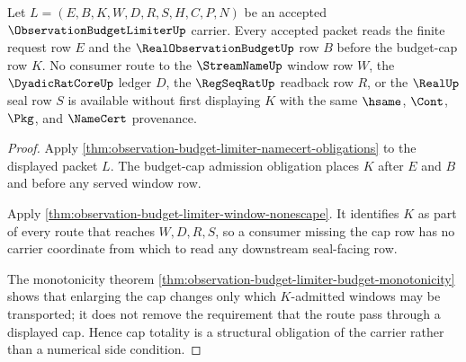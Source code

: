 \begin{theorem}
\label{thm:observation-budget-limiter-budget-cap-totality}
Let $L=(E,B,K,W,D,R,S,H,C,P,N)$ be an accepted $\ObservationBudgetLimiterUp$ carrier. Every accepted packet reads the finite request row $E$ and the $\RealObservationBudgetUp$ row $B$ before the budget-cap row $K$. No consumer route to the $\StreamNameUp$ window row $W$, the $\DyadicRatCoreUp$ ledger $D$, the $\RegSeqRatUp$ readback row $R$, or the $\RealUp$ seal row $S$ is available without first displaying $K$ with the same $\hsame$, $\Cont$, $\Pkg$, and $\NameCert$ provenance.
\end{theorem}
\begin{proof}
Apply \autoref{thm:observation-budget-limiter-namecert-obligations} to the displayed packet $L$. The budget-cap admission obligation places $K$ after $E$ and $B$ and before any served window row.

Apply \autoref{thm:observation-budget-limiter-window-nonescape}. It identifies $K$ as part of every route that reaches $W,D,R,S$, so a consumer missing the cap row has no carrier coordinate from which to read any downstream seal-facing row.

The monotonicity theorem \autoref{thm:observation-budget-limiter-budget-monotonicity} shows that enlarging the cap changes only which $K$-admitted windows may be transported; it does not remove the requirement that the route pass through a displayed cap. Hence cap totality is a structural obligation of the carrier rather than a numerical side condition.
\end{proof}

